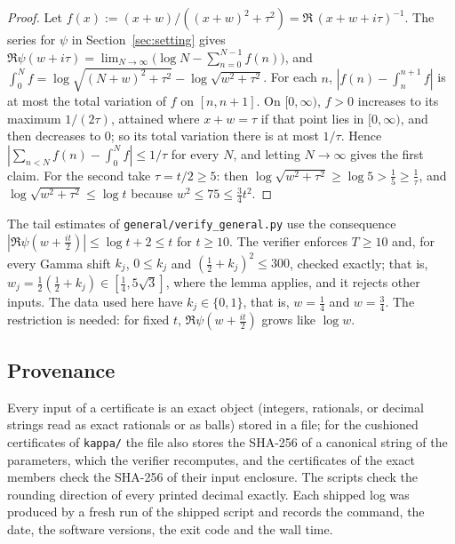 \begin{proof}
Let $f(x):=(x+w)/((x+w)^2+\tau^2)=\Re\,(x+w+i\tau)^{-1}$. The series for $\psi$ in Section~\ref{sec:setting} gives
$\Re\psi(w+i\tau)=\lim_{N\to\infty}\bigl(\log N-\sum_{n=0}^{N-1}f(n)\bigr)$, and $\int_0^Nf=\log\sqrt{(N+w)^2+\tau^2}-\log\sqrt{w^2+\tau^2}$. For each
$n$, $|f(n)-\int_n^{n+1}f|$ is at most the total variation of $f$ on $[n,n+1]$. On $[0,\infty)$, $f>0$ increases to its maximum $1/(2\tau)$,
attained where $x+w=\tau$ if that point lies in $[0,\infty)$, and then decreases to $0$; so its total variation there is at most $1/\tau$.
Hence $|\sum_{n<N}f(n)-\int_0^Nf|\le1/\tau$ for every $N$, and letting $N\to\infty$ gives the first claim. For the second take $\tau=t/2\ge5$:
then $\log\sqrt{w^2+\tau^2}\ge\log5>\frac15\ge\frac1\tau$, and $\log\sqrt{w^2+\tau^2}\le\log t$ because $w^2\le75\le\frac34t^2$.
\end{proof}

The tail estimates of \nolinkurl{general/verify_general.py} use the consequence $|\Re\psi(w+\frac{it}2)|\le\log t+2\le t$ for $t\ge10$.
The verifier enforces $T\ge10$ and, for every Gamma shift $k_j$, $0\le k_j$ and $(\frac12+k_j)^2\le300$, checked exactly; that is,
$w_j=\frac12(\frac12+k_j)\in[\frac14,5\sqrt3]$, where the lemma applies, and it rejects other inputs. The data used here have $k_j\in\{0,1\}$,
that is, $w=\frac14$ and $w=\frac34$. The restriction is needed: for fixed $t$, $\Re\psi(w+\frac{it}2)$ grows like $\log w$.

\subsection{Provenance}

Every input of a certificate is an exact object (integers, rationals, or decimal strings read as exact rationals or as balls) stored in a
file; for the cushioned certificates of \nolinkurl{kappa/} the file also stores the SHA-256 of a canonical string of the parameters, which the
verifier recomputes, and the certificates of the exact members check the SHA-256 of their input enclosure.
The scripts check the rounding direction of every printed decimal exactly. Each shipped log was produced by a fresh run of the shipped
script and records the command, the date, the software versions, the exit code and the wall time.
